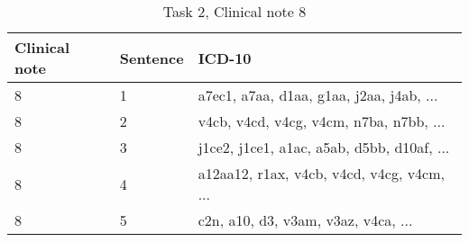 \begin{table}[!htb] \footnotesize \center
\caption{Task 2, Clinical note 8 \label{tab:t2c8}}
\begin{tabularx}{\textwidth}{l l X}
    \toprule
    Clinical note & Sentence & ICD-10 \\
    \midrule
	 8 & 1 & a7ec1, a7aa, d1aa, g1aa, j2aa, j4ab, ... \\
	 8 & 2 & v4cb, v4cd, v4cg, v4cm, n7ba, n7bb, ... \\
	 8 & 3 & j1ce2, j1ce1, a1ac, a5ab, d5bb, d10af, ... \\
	 8 & 4 & a12aa12, r1ax, v4cb, v4cd, v4cg, v4cm, ... \\
	 8 & 5 & c2n, a10, d3, v3am, v3az, v4ca, ... \\
	\bottomrule
\end{tabularx}
\end{table}